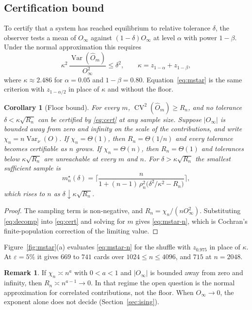 \documentclass[ba,preprint]{imsart}
\theoremstyle{plain}
\newtheorem{corollary}[theorem]{Corollary}
\theoremstyle{definition}
\newtheorem{remark}[theorem]{Remark}
\newcommand{\Var}{\operatorname{Var}}
\newcommand{\CV}{\operatorname{CV}}
\newcommand{\Oh}{\widehat{O}}
\begin{document}
\subsection{Certification bound}

To certify that a system has reached equilibrium to relative tolerance $\delta$, the observer tests a mean of $O_\infty$ against $(1-\delta)O_\infty$ at level $\alpha$ with power $1-\beta$. Under the normal approximation this requires
\begin{equation}\label{eq:cert}
\kappa^2\,\frac{\Var(\Oh_m)}{O_\infty^2}\le\delta^2,\qquad\kappa=z_{1-\alpha}+z_{1-\beta},
\end{equation}
where $\kappa\approx2.486$ for $\alpha=0.05$ and $1-\beta=0.80$. Equation~\eqref{eq:mstar} is the same criterion with $z_{1-\alpha/2}$ in place of $\kappa$ and without the floor.

\begin{corollary}[Floor bound]\label{cor:floor}
For every $m$, $\CV^2(\Oh_m)\ge R_n$, and no tolerance $\delta<\kappa\sqrt{R_n}$ can be certified by \eqref{eq:cert} at any sample size. Suppose $|O_\infty|$ is bounded away from zero and infinity on the scale of the contributions, and write $\chi_n=n\Var_\nu(O)$. If $\chi_n=\Theta(1)$, then $R_n=\Theta(1/n)$ and every tolerance becomes certifiable as $n$ grows. If $\chi_n=\Theta(n)$, then $R_n=\Theta(1)$ and tolerances below $\kappa\sqrt{R_n}$ are unreachable at every $m$ and $n$. For $\delta>\kappa\sqrt{R_n}$ the smallest sufficient sample is
\begin{equation}\label{eq:mstar-n}
m_n^\star(\delta)=\biggl\lceil\frac{n}{1+(n-1)\,\rho_n^2\bigl(\delta^2/\kappa^2-R_n\bigr)}\biggr\rceil,
\end{equation}
which rises to $n$ as $\delta\downarrow\kappa\sqrt{R_n}$.
\end{corollary}

\begin{proof}
The sampling term is non-negative, and $R_n=\chi_n/(nO_\infty^2)$. Substituting \eqref{eq:decomp} into \eqref{eq:cert} and solving for $m$ gives \eqref{eq:mstar-n}, which is Cochran's finite-population correction of the limiting value.
\end{proof}

Figure~\ref{fig:mstar}(a) evaluates \eqref{eq:mstar-n} for the shuffle with $z_{0.975}$ in place of $\kappa$. At $\varepsilon=5\%$ it gives $669$ to $741$ cards over $1024\le n\le4096$, and $715$ at $n=2048$.

\begin{remark}\label{rem:subext}
If $\chi_n\asymp n^a$ with $0<a<1$ and $|O_\infty|$ is bounded away from zero and infinity, then $R_n\asymp n^{a-1}\to0$. In that regime the open question is the normal approximation for correlated contributions, not the floor. When $O_\infty\to0$, the exponent alone does not decide (Section~\ref{sec:ising}).
\end{remark}
\end{document}
